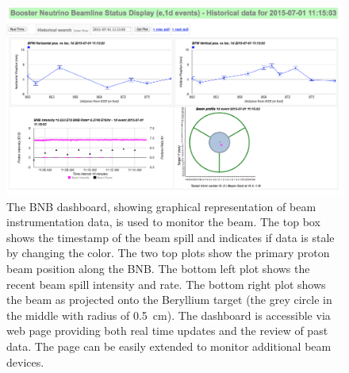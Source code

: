 \begin{figure}
\centering	
\includegraphics[width=0.95\linewidth]{figures/beam_monitoring.png}
\caption{The BNB dashboard, showing graphical representation of beam instrumentation data, is used to monitor the beam. The top box shows the timestamp of the beam spill and indicates if data is stale by changing the color. The two top plots show the primary proton beam position along the BNB. The bottom left plot shows the recent beam spill intensity and rate. The bottom right plot shows the beam as projected onto the Beryllium target (the grey circle in the middle with radius of 0.5~cm). The dashboard is accessible via web page providing both real time updates and the review of past data. The page can be easily extended to monitor additional beam devices.}
\label{fig:beammonitor}
\end{figure}


